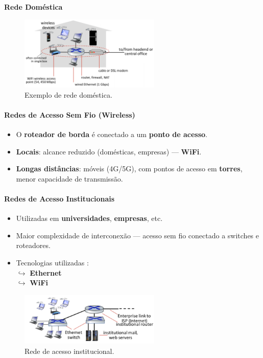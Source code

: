     {\textbf{Rede Doméstica}}

    \begin{figure}[H]
        \centering
        \includegraphics[width=0.6\textwidth]{img/cap-01/rede-domestica.png}
        \caption{Exemplo de rede doméstica.}
    \end{figure}

    \paragraph{Redes de Acesso Sem Fio (Wireless)}
    \begin{itemize}
        \item O \textbf{roteador de borda} é conectado a um \textbf{ponto de acesso}.
        \item \textbf{Locais}: alcance reduzido (domésticas, empresas) — \textbf{WiFi}.
        \item \textbf{Longas distâncias}: móveis (4G/5G), com pontos de acesso em \textbf{torres}, menor capacidade de transmissão.
    \end{itemize}

    \paragraph{Redes de Acesso Institucionais}
    \begin{itemize}
        \item Utilizadas em \textbf{universidades}, \textbf{empresas}, etc.
        \item Maior complexidade de interconexão — acesso sem fio conectado a switches e roteadores.
        \item Tecnologias utilizadas : \\
            $\hookrightarrow$ \textbf{Ethernet} \\
            $\hookrightarrow$ \textbf{WiFi}
    \end{itemize}

    \begin{figure}[H]
        \centering
        \includegraphics[width=0.6\textwidth]{img/cap-01/rede-institucional.png}
        \caption{Rede de acesso institucional.}
    \end{figure}

